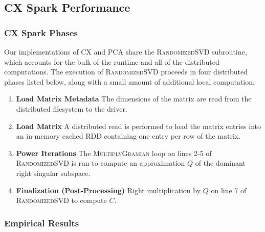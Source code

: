   \subsection{CX Spark Performance} %

  \subsubsection{CX Spark Phases}
  Our implementations of CX and PCA share the \textsc{RandomizedSVD} subroutine, which accounts for the bulk of the runtime and all of the distributed computations.
  The execution of \textsc{RandomizedSVD} proceeds in four distributed phases listed below, along with a small amount of additional local computation.
  \begin{enumerate}
      \item \textbf{Load Matrix Metadata}
         The dimensions of the matrix are read from the distributed filesystem to the driver.
      \item \textbf{Load Matrix}
         A distributed read is performed to load the matrix entries into an in-memory cached
         RDD containing one entry per row of the matrix.
      \item \textbf{Power Iterations}
         The \textsc{MultiplyGramian} loop on lines 2-5 of
         \textsc{RandomizedSVD} is run to compute an approximation $Q$
         of the dominant right singular subspace.
       \item \textbf{Finalization (Post-Processing)}
         Right multiplication by $Q$ on line 7 of \textsc{RandomizedSVD} to compute $C$.
  \end{enumerate}

  \subsubsection{Empirical Results}

